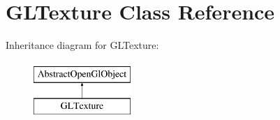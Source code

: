\hypertarget{class_g_l_texture}{\section{G\-L\-Texture Class Reference}
\label{class_g_l_texture}
}
Inheritance diagram for G\-L\-Texture\-:\begin{figure}[H]
\begin{center}
\leavevmode
\includegraphics[height=2.000000cm]{class_g_l_texture}
\end{center}
\end{figure}
